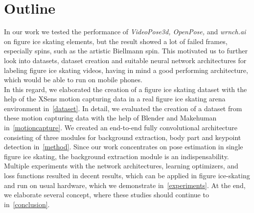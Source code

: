     \section{Outline}
    In our work we tested the performance of \textit{VideoPose3d, OpenPose,} and \textit{wrnch.ai} on figure ice skating elements,
but the result showed a lot of failed frames, especially spins, such as the artistic Biellmann spin.
This motivated us to further look into datasets, dataset creation and suitable neural network architectures for labeling
figure ice skating videos, having in mind a good performing architecture, which would be able to run on mobile phones.\\
    In this regard, we elaborated the creation of a figure ice skating dataset with the help of the XSens motion capturing data in a
    real figure ice skating arena
    environment in~\autoref{dataset}.
    In detail, we evaluated the creation of a dataset from these motion capturing data with the help of Blender and
    Makehuman in~\autoref{motioncapture}.
    We created an end-to-end fully convolutional architecture consisting of three modules for background extraction,
    body part and keypoint detection in~\autoref{method}.
    Since our work concentrates on pose estimation in single figure ice skating, the background extraction module is
    an indispensability.
    Multiple experiments with the network architectures, learning optimizers, and loss functions resulted in decent
    results,
    which can be applied in figure ice-skating and run on usual hardware, which we demonstrate in~\autoref{experiments}.
    At the end, we elaborate several concept, where these studies should continue to in~\autoref{conclusion}.



